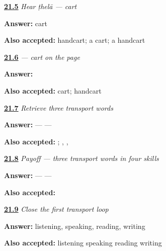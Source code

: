 \noindent\begin{minipage}[t]{\linewidth}
\raggedright
\hyperlink{review-MW-C16-hear-thela-meaning}{\textbf{21.5}} \emph{Hear \emph{ṭhelā} — cart}\par
\small \textbf{Answer:} cart\par
\footnotesize \textbf{Also accepted:} handcart; a cart; a handcart
\end{minipage}\par\medskip

\noindent\begin{minipage}[t]{\linewidth}
\raggedright
\hyperlink{review-MW-C16-thela-dictation}{\textbf{21.6}} \emph{ — cart on the page}\par
\small \textbf{Answer:} \par
\footnotesize \textbf{Also accepted:}  cart;  handcart
\end{minipage}\par\medskip

\noindent\begin{minipage}[t]{\linewidth}
\raggedright
\hyperlink{review-MW-R16-transport-three-recall}{\textbf{21.7}} \emph{Retrieve three transport words}\par
\small \textbf{Answer:}  —  — \par
\footnotesize \textbf{Also accepted:}   ; , , 
\end{minipage}\par\medskip

\noindent\begin{minipage}[t]{\linewidth}
\raggedright
\hyperlink{review-MW-C16-transport-three-payoff}{\textbf{21.8}} \emph{Payoff — three transport words in four skills}\par
\small \textbf{Answer:}  —  — \par
\footnotesize \textbf{Also accepted:}   
\end{minipage}\par\medskip

\noindent\begin{minipage}[t]{\linewidth}
\raggedright
\hyperlink{review-MW-R16-transport-close-recall}{\textbf{21.9}} \emph{Close the first transport loop}\par
\small \textbf{Answer:} listening, speaking, reading, writing\par
\footnotesize \textbf{Also accepted:} listening speaking reading writing
\end{minipage}\par\medskip

